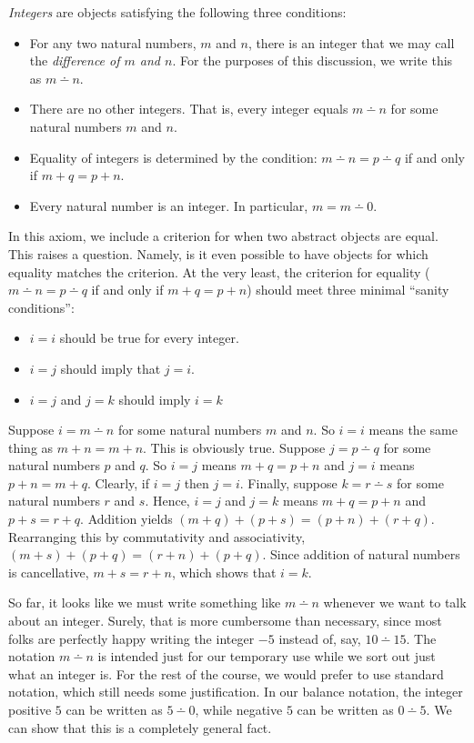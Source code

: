\documentclass[10pt,oneside,tightlist]{memoir}
\begin{document}
\begin{axiom}
  \emph{Integers} are objects satisfying the following three conditions:
  \begin{itemize}
  \item For any two natural numbers, $m$ and $n$, there is an integer
    that we may call the \emph{difference of $m$ and $n$}. For the
    purposes of this discussion, we write this as $m\dotminus n$.
  \item There are no other integers. That is, every integer equals
    $m\dotminus n$ for some natural numbers $m$ and $n$.
  \item Equality of integers is determined by the condition:
    $m\dotminus n = p\dotminus q$ if and only if $m+q = p+n$.
  \item Every natural number is an integer. In particular, $m = m\dotminus 0$.
  \end{itemize}
\end{axiom}


In this axiom, we include a criterion for when two abstract objects are equal.
This raises a question. Namely, is it even possible to have objects for which
equality matches the criterion. At the very least, the criterion for equality
($m\dotminus n = p \dotminus q$ if and only if $m+q = p+n$) should meet three
minimal ``sanity conditions'':
\begin{itemize}
\item $i=i$ should be true for every integer.
\item $i=j$ should imply that $j=i$.
\item $i=j$ and $j=k$ should imply $i=k$
\end{itemize}

Suppose $i = m\dotminus n$ for some natural numbers $m$ and $n$. So 
$i = i$ means the same thing as $m + n = m+n$. This is obviously
true. Suppose $j = p\dotminus q$ for some natural numbers $p$ and $q$.
So $i = j$ means $m+q = p+n$ and $j=i$ means $p+n = m+q$.  Clearly, if
$i=j$ then $j=i$. Finally, suppose $k=r\dotminus s$ for some natural
numbers $r$ and $s$. Hence, $i=j$ and $j=k$ means $m+q = p + n$ and
$p+s = r+q$.  Addition yields $(m+q)+(p+s) = (p+n)+(r+q)$. Rearranging
this by commutativity and associativity, $(m+s)+(p+q) = (r+n)+(p+q)$.
Since addition of natural numbers is cancellative, $m+s = r+n$, which
shows that $i=k$.

So far, it looks like we must write something like $m\dotminus n$
whenever we want to talk about an integer.  Surely, that is more cumbersome 
than necessary, since most folks are perfectly happy writing the
integer $-5$ instead of, say, $10\dotminus 15$. The notation $m\dotminus n$
is intended just for our temporary use while we sort out just what 
an integer is. For the rest of the course, we would prefer to use
standard notation, which still needs some justification.
In our balance notation, the integer positive $5$ can be written as $5\dotminus 0$,
while negative $5$ can be written as $0\dotminus 5$. We can show that
this is a completely general fact. 
\end{document}
